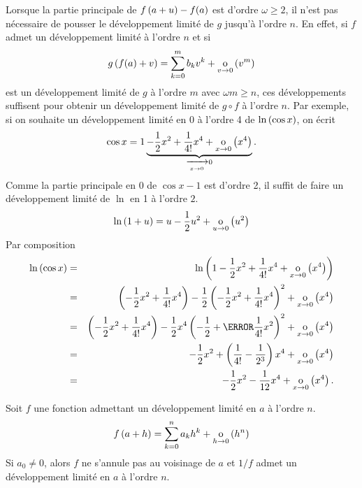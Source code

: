 \documentclass{magnolia}
\begin{document}
\begin{remarqueUnique}
\remarque Lorsque la partie principale de $f\left(a+u\right)-f(a)$ est d'ordre $\omega\geq 2$, il n'est pas nécessaire de pousser le développement limité de $g$ jusqu'à l'ordre $n$. En effet, si $f$ admet un développement limité à l'ordre $n$ et si
\[g\left(f(a)+v\right)=\sum_{k=0}^m b_k v^k+\underset{v \rightarrow 0}{\text{o}}\left(v^m\right)\]
est un développement limité de $g$ à l'ordre $m$ avec $\omega m\geq n$, ces développements suffisent pour obtenir un développement limité de $g\circ f$ à l'ordre $n$. Par
  exemple, si on souhaite un développement limité en 0 à l'ordre 4 de
  $\ln\left(\cos x\right)$, on écrit
  \[\cos x=1\underbrace{-\frac{1}{2}x^2+\frac{1}{4!}x^4+\petitozero{x}{x^4}}_%
    {\tendvers{x}{0}0}.\]
  Comme la partie principale en $0$ de $\cos x-1$ est d'ordre 2, il suffit de
  faire un développement limité de $\ln$ en 1 à l'ordre $2$.
  \[\ln\left(1+u\right)=u-\frac{1}{2}u^2+\underset{u \rightarrow 0}{\text{o}}\left(u^2\right)\]
  Par composition
  \begin{eqnarray*}
  \ln\p{\cos x}
  &=& \ln\p{1-\frac{1}{2}x^2+\frac{1}{4!}x^4+\petitozero{x}{x^4}}\\
  &=& \p{-\frac{1}{2}x^2+\frac{1}{4!}x^4}
       -\frac{1}{2}\p{-\frac{1}{2}x^2+\frac{1}{4!}x^4}^2+\petitozero{x}{x^4}\\
  &=& \p{-\frac{1}{2}x^2+\frac{1}{4!}x^4}
       -\frac{1}{2}x^4\p{-\frac{1}{2}+\cancel{\frac{1}{4!}x^2}}^2+
       \petitozero{x}{x^4}\\
  &=& -\frac{1}{2}x^2+\p{\frac{1}{4!}-\frac{1}{2^3}}x^4+\petitozero{x}{x^4}\\
  &=& -\frac{1}{2}x^2-\frac{1}{12}x^4+\petitozero{x}{x^4}.
  \end{eqnarray*}
\end{remarqueUnique}

\begin{proposition}[utile=-3]
Soit $f$ une fonction admettant un développement limité en $a$ à
l'ordre $n$.
\[f\left(a+h\right)=\sum_{k=0}^n a_k h^k+\underset{h \rightarrow 0}{\text{o}}\left(h^n\right)\]
Si $a_0\neq 0$, alors $f$ ne s'annule pas au voisinage de $a$ et $1/f$ admet un
développement limité en $a$ à l'ordre $n$.
\end{proposition}
\end{document}
